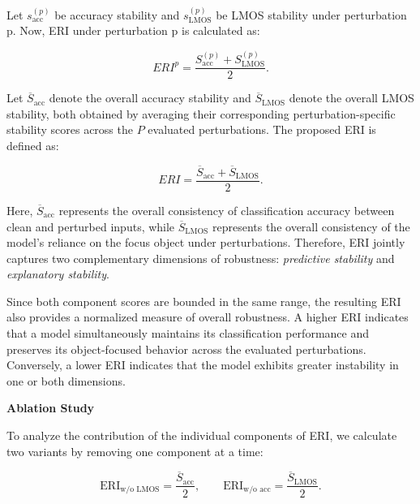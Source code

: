 \documentclass[a4paper,fleqn]{cas-dc}
\begin{document}
Let ${s}_{\text{acc}}^{{(p)}}$ be accuracy stability and ${s}_{\text{LMOS}}^{{(p)}}$ be LMOS stability under perturbation p. Now, ERI under perturbation p is calculated as:


\begin{equation}
ERI^{{p}} =
\frac{
{S}_{\text{acc}}^{{(p)}}
+
{S}_{\text{LMOS}}^{{(p)}}
}{2}.
\end{equation}

Let $\overline{S}_{\text{acc}}$ denote the overall accuracy stability and $\overline{S}_{\text{LMOS}}$ denote the overall LMOS stability, both obtained by averaging their corresponding perturbation-specific stability scores across the $P$ evaluated perturbations. The proposed ERI is defined as:

\begin{equation}
ERI =
\frac{
\overline{S}_{\text{acc}}
+
\overline{S}_{\text{LMOS}}
}{2}.
\end{equation}

Here, $\overline{S}_{\text{acc}}$ represents the overall consistency of classification accuracy between clean and perturbed inputs, while $\overline{S}_{\text{LMOS}}$ represents the overall consistency of the model's reliance on the focus object under perturbations. Therefore, ERI jointly captures two complementary dimensions of robustness: \textit{predictive stability} and \textit{explanatory stability}.

Since both component scores are bounded in the same range, the resulting ERI also provides a normalized measure of overall robustness. A higher ERI indicates that a model simultaneously maintains its classification performance and preserves its object-focused behavior across the evaluated perturbations. Conversely, a lower ERI indicates that the model exhibits greater instability in one or both dimensions.

\noindent\textbf{Ablation Study}

To analyze the contribution of the individual components of ERI, we calculate two variants by removing one component at a time:

\begin{equation}
\mathrm{ERI}_{\text{w/o LMOS}} =
\frac{\overline{S}_{\text{acc}}}{2},
\qquad
\mathrm{ERI}_{\text{w/o acc}} =
\frac{\overline{S}_{\text{LMOS}}}{2}.
\end{equation}
\end{document}
